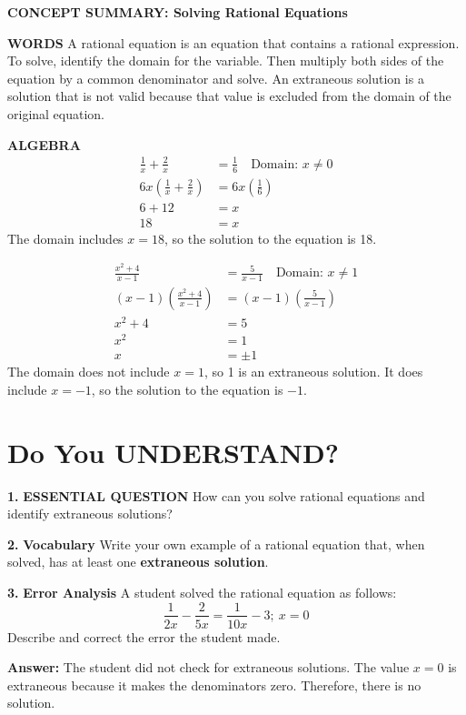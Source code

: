 \documentclass{article}
\newenvironment{concept-summary}{}{}
\newenvironment{practice}[2]{\textbf{#1.}}{\vspace{1em}}
\newcommand{\answer}[1]{\par\textbf{Answer:} #1}
\begin{document}
\begin{concept-summary}
\textbf{CONCEPT SUMMARY: Solving Rational Equations}

\textbf{WORDS}
A rational equation is an equation that contains a rational expression. To solve, identify the domain for the variable. Then multiply both sides of the equation by a common denominator and solve. An extraneous solution is a solution that is not valid because that value is excluded from the domain of the original equation.

\textbf{ALGEBRA}
\begin{align*}
\frac{1}{x} + \frac{2}{x} &= \frac{1}{6} \quad \text{Domain: } x \neq 0 \\
6x\left(\frac{1}{x} + \frac{2}{x}\right) &= 6x\left(\frac{1}{6}\right) \\
6 + 12 &= x \\
18 &= x
\end{align*}
The domain includes $x = 18$, so the solution to the equation is 18.

\begin{align*}
\frac{x^2+4}{x-1} &= \frac{5}{x-1} \quad \text{Domain: } x \neq 1 \\
(x-1)\left(\frac{x^2+4}{x-1}\right) &= (x-1)\left(\frac{5}{x-1}\right) \\
x^2+4 &= 5 \\
x^2 &= 1 \\
x &= \pm 1
\end{align*}
The domain does not include $x = 1$, so 1 is an extraneous solution. It does include $x = -1$, so the solution to the equation is $-1$.
\end{concept-summary}

\section*{Do You UNDERSTAND?}
\begin{practice}{1}{DOK}
\textbf{ESSENTIAL QUESTION} How can you solve rational equations and identify extraneous solutions?
\end{practice}

\begin{practice}{2}{DOK}
\textbf{Vocabulary} Write your own example of a rational equation that, when solved, has at least one \textbf{extraneous solution}.
\end{practice}

\begin{practice}{3}{DOK}
\textbf{Error Analysis} A student solved the rational equation as follows:
\[ \frac{1}{2x} - \frac{2}{5x} = \frac{1}{10x} - 3; \ x = 0 \]
Describe and correct the error the student made.
\answer{The student did not check for extraneous solutions. The value $x = 0$ is extraneous because it makes the denominators zero. Therefore, there is no solution.}
\end{practice}
\end{document}
